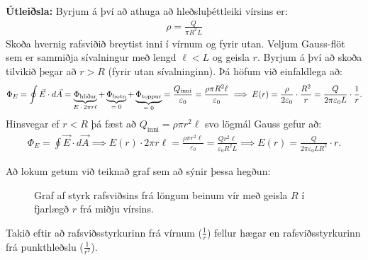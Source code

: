 \textbf{Útleiðsla:} Byrjum á því að athuga að hleðsluþéttleiki vírsins er:
\begin{align*}
    \rho = \frac{Q}{\pi R^2 L}
\end{align*}
Skoða hvernig rafsviðið breytist inni í vírnum og fyrir utan. Veljum Gauss-flöt sem er sammiðja sívalningur með lengd $\ell < L$ og geisla $r$. Byrjum á því að skoða tilvikið þegar að $r > R$ (fyrir utan sívalninginn). Þá höfum við einfaldlega að:
\begin{align*}
    \Phi_{E} = \oint \vec{E} \cdot d\vec{A} = \underbrace{\Phi_{\text{hliðar}}}_\textrm{$E \cdot 2\pi r \ell$} + \underbrace{\Phi_{\text{botn}}}_\textrm{$= 0$} + \underbrace{\Phi_{\text{toppur}}}_\textrm{$= 0$} = \frac{Q_{\text{inni}}}{\varepsilon_0} = \frac{\rho \pi R^2 \ell}{\varepsilon_0} \implies E(r) = \frac{\rho}{2\varepsilon_0} \cdot \frac{R^2}{r} = \frac{Q}{2\pi \varepsilon_0 L} \cdot \frac{1}{r}.
\end{align*}
Hinsvegar ef $r < R$ þá fæst að $Q_{\text{inni}} = \rho \pi r^2 \ell$ svo lögmál Gauss gefur að:
\begin{align*}
    \Phi_{E} = \oint \vec{E} \cdot d\vec{A} \implies E(r) \cdot 2\pi r \ell = \frac{\rho \pi r^2 \ell}{\varepsilon_0} = \frac{Q r^2 \ell}{\varepsilon_0 R^2 L} \implies E(r) = \frac{Q}{2\pi \varepsilon_0 L R^2} \cdot r.
\end{align*}

Að lokum getum við teiknað graf sem að sýnir þessa hegðun:


\begin{figure}[H]
    \centering
    \caption{Graf af styrk rafsviðsins frá löngum beinum vír með geisla $R$ í fjarlægð $r$ frá miðju vírsins.}
\end{figure}
Takið eftir að rafsviðsstyrkurinn frá vírnum ($\frac{1}{r}$) fellur hægar en rafsviðsstyrkurinn frá punkthleðslu ($ \frac{1}{r^2}$).

